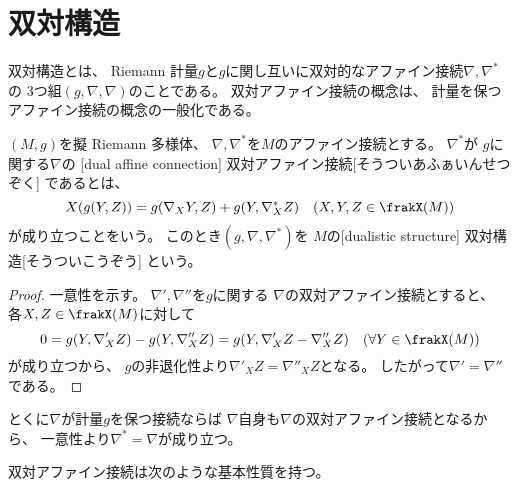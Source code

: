 \documentclass[report]{jlreq}
\begin{document}
%
\section{双対構造}

双対構造とは、
Riemann 計量$g$と$g$に関し互いに双対的なアファイン接続$\nabla, \nabla^*$の
3つ組$(g, \nabla, \nabla)$のことである。
双対アファイン接続の概念は、
計量を保つアファイン接続の概念の一般化である。

\begin{definition}[双対アファイン接続]
    $(M, g)$を擬 Riemann 多様体、
    $\nabla, \nabla^*$を$M$のアファイン接続とする。
    $\nabla^*$が
    $g$に関する$\nabla$の
    [dual affine connection]
        {双対アファイン接続}[そうついあふぁいんせつぞく]
    であるとは、
    \begin{equation}
        X(g(Y, Z))
            = g(\nabla_X Y, Z)
            + g(Y, \nabla^*_X Z)
            \quad
            (X, Y, Z \in \frakX(M))
    \end{equation}
    が成り立つことをいう。
    このとき$(g, \nabla, \nabla^*)$を
    $M$の[dualistic structure]
        {双対構造}[そうついこうぞう]
    という。
\end{definition}

\begin{proposition}[双対アファイン接続の存在と一意性]
    \TODO{}
\end{proposition}

\begin{proof}

    一意性を示す。
    $\nabla', \nabla''$を$g$に関する
    $\nabla$の双対アファイン接続とすると、
    各$X, Z \in \frakX(M)$に対して
    \begin{equation}
        0 = g(Y, \nabla'_X Z) - g(Y, \nabla''_X Z)
            = g(Y, \nabla'_X Z - \nabla''_X Z)
            \quad
            (\forall Y \in \frakX(M))
    \end{equation}
    が成り立つから、
    $g$の非退化性より$\nabla'_X Z = \nabla''_X Z$となる。
    したがって$\nabla' = \nabla''$である。
\end{proof}

とくに$\nabla$が計量$g$を保つ接続ならば
$\nabla$自身も$\nabla$の双対アファイン接続となるから、
一意性より$\nabla^* = \nabla$が成り立つ。

双対アファイン接続は次のような基本性質を持つ。
\end{document}
